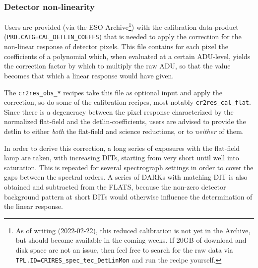 \subsubsection{Detector non-linearity}
\label{sec:detlin}



Users are provided (via the ESO Archive\footnote{As of writing (2022-02-22),
this reduced calibration is not yet in the Archive, but should become available
in the coming weeks. If 20GB of download and disk space are not an issue, then
feel free to search for the raw data via
\texttt{TPL.ID=CRIRES\_spec\_tec\_DetLinMon} and run the recipe yourself.}) with the
calibration data-product (\verb!PRO.CATG=CAL_DETLIN_COEFFS!) that is needed to
apply the correction for the non-linear response of detector pixels. This file
contains for each pixel the coefficients of a polynomial which, when evaluated
at a certain ADU-level, yields the correction factor by which to multiply the
raw ADU, so that the value becomes that which a linear response would have
given.

The \verb!cr2res_obs_*! recipes take
this file as optional input and apply the correction, so do some of the
calibration recipes, most notably \verb!cr2res_cal_flat!. Since there is a
degeneracy between the pixel response characterized by the normalized flat-field
and the detlin-coefficients, users are advised to provide the detlin to either
\emph{both} the flat-field and science reductions, or to \emph{neither} of them.


In order to derive this correction, a long series of exposures with the
flat-field lamp are taken, with increasing DITs, starting from very short until
well into saturation. This is repeated for several spectrograph settings in
order to cover the gaps between the spectral orders. A series of DARKs with
matching DIT is also obtained and subtracted from the FLATS, because the
non-zero detector background pattern at short DITs would otherwise influence the
determination of the linear response.

